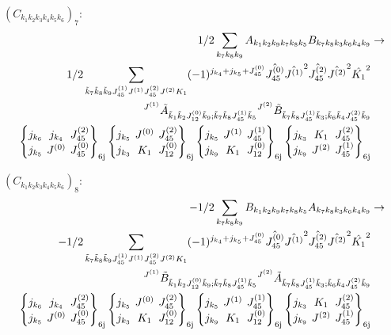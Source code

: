 \documentclass[11pt]{article}
\newcommand{\sixj}[6]{\begingroup\setlength{\arraycolsep}{0.2em}\begin{Bmatrix} #1 & #2 & #3 \\ #4 & #5 & #6 \end{Bmatrix}_{\text{6j}}\endgroup}
\begin{document}
$\left({C}_{{k}_{1}{k}_{2}{k}_{3}{k}_{4}{k}_{5}{k}_{6}}\right)_{7}$:
\begin{align}
1/2\sum_{{k}_{7}{k}_{8}{k}_{9}}{A}_{{k}_{1}{k}_{2}{k}_{9}{k}_{7}{k}_{8}{k}_{5}}{B}_{{k}_{7}{k}_{8}{k}_{3}{k}_{6}{k}_{4}{k}_{9}}&\rightarrow \notag \\1/2\sum_{\tilde{k}_{7}\tilde{k}_{8}\tilde{k}_{9}J^{(1)}_{45}J^{(1)}J^{(2)}_{45}J^{(2)}K_{1}}(-1)^{j_{{k}_{4}} +j_{{k}_{5}} +J^{(0)}_{45} }\hat{J^{(0)}_{45}}\hat{J^{(1)}}^{2}\hat{J^{(2)}_{45}}\hat{J^{(2)}}^{2}\hat{K_{1}}^{2}& \notag \\{}^{J^{(1)}}\tilde{A}_{\tilde{k}_{1}\tilde{k}_{2}J^{(0)}_{12}\tilde{k}_{9};\tilde{k}_{7}\tilde{k}_{8}J^{(1)}_{45}\tilde{k}_{5}}{}^{J^{(2)}}\tilde{B}_{\tilde{k}_{7}\tilde{k}_{8}J^{(1)}_{45}\tilde{k}_{3};\tilde{k}_{6}\tilde{k}_{4}J^{(2)}_{45}\tilde{k}_{9}}& \notag \\\sixj{j_{{k}_{6}}}{j_{{k}_{4}}}{J^{(2)}_{45}}{j_{{k}_{5}}}{J^{(0)}}{J^{(0)}_{45}}\sixj{j_{{k}_{5}}}{J^{(0)}}{J^{(2)}_{45}}{j_{{k}_{3}}}{K_{1}}{J^{(0)}_{12}}\sixj{j_{{k}_{5}}}{J^{(1)}}{J^{(1)}_{45}}{j_{{k}_{9}}}{K_{1}}{J^{(0)}_{12}}\sixj{j_{{k}_{3}}}{K_{1}}{J^{(2)}_{45}}{j_{{k}_{9}}}{J^{(2)}}{J^{(1)}_{45}}
\end{align}

$\left({C}_{{k}_{1}{k}_{2}{k}_{3}{k}_{4}{k}_{5}{k}_{6}}\right)_{8}$:
\begin{align}
-1/2\sum_{{k}_{7}{k}_{8}{k}_{9}}{B}_{{k}_{1}{k}_{2}{k}_{9}{k}_{7}{k}_{8}{k}_{5}}{A}_{{k}_{7}{k}_{8}{k}_{3}{k}_{6}{k}_{4}{k}_{9}}&\rightarrow \notag \\-1/2\sum_{\tilde{k}_{7}\tilde{k}_{8}\tilde{k}_{9}J^{(1)}_{45}J^{(1)}J^{(2)}_{45}J^{(2)}K_{1}}(-1)^{j_{{k}_{4}} +j_{{k}_{5}} +J^{(0)}_{45} }\hat{J^{(0)}_{45}}\hat{J^{(1)}}^{2}\hat{J^{(2)}_{45}}\hat{J^{(2)}}^{2}\hat{K_{1}}^{2}& \notag \\{}^{J^{(1)}}\tilde{B}_{\tilde{k}_{1}\tilde{k}_{2}J^{(0)}_{12}\tilde{k}_{9};\tilde{k}_{7}\tilde{k}_{8}J^{(1)}_{45}\tilde{k}_{5}}{}^{J^{(2)}}\tilde{A}_{\tilde{k}_{7}\tilde{k}_{8}J^{(1)}_{45}\tilde{k}_{3};\tilde{k}_{6}\tilde{k}_{4}J^{(2)}_{45}\tilde{k}_{9}}& \notag \\\sixj{j_{{k}_{6}}}{j_{{k}_{4}}}{J^{(2)}_{45}}{j_{{k}_{5}}}{J^{(0)}}{J^{(0)}_{45}}\sixj{j_{{k}_{5}}}{J^{(0)}}{J^{(2)}_{45}}{j_{{k}_{3}}}{K_{1}}{J^{(0)}_{12}}\sixj{j_{{k}_{5}}}{J^{(1)}}{J^{(1)}_{45}}{j_{{k}_{9}}}{K_{1}}{J^{(0)}_{12}}\sixj{j_{{k}_{3}}}{K_{1}}{J^{(2)}_{45}}{j_{{k}_{9}}}{J^{(2)}}{J^{(1)}_{45}}
\end{align}
\end{document}
